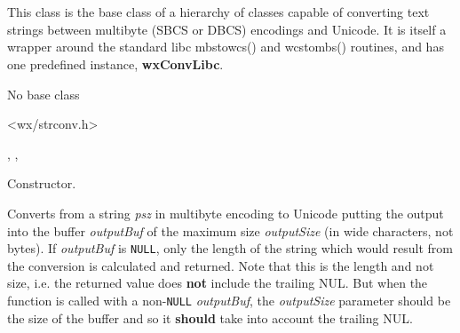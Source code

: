 %
%

\section{}\label{wxmbconv}

This class is the base class of a hierarchy of classes capable of converting
text strings between multibyte (SBCS or DBCS) encodings and Unicode. It is itself
a wrapper around the standard libc mbstowcs() and wcstombs() routines, and has
one predefined instance, {\bf wxConvLibc}.


No base class


<wx/strconv.h>


, 
, 



\label{wxmbconvwxmbconv}


Constructor.

\label{wxmbconvmb2wc}


Converts from a string {\it psz} in multibyte encoding to Unicode putting the
output into the buffer {\it outputBuf} of the maximum size {\it outputSize} (in wide
characters, not bytes). If {\it outputBuf} is {\tt NULL}, only the length of the
string which would result from the conversion is calculated and returned.
Note that this is the length and not size, i.e. the returned value does 
{\bf not} include the trailing NUL. But when the function is called with a
non-{\tt NULL} {\it outputBuf}, the {\it outputSize} parameter should be the size of the buffer
and so it {\bf should} take into account the trailing NUL.



